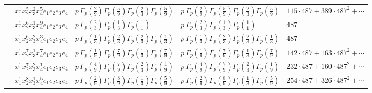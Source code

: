 \documentclass[11pt]{article}
\begin{document}
\begin{table}[ht]
{\begin{tabular}{@{}lllll@{}}
 & $x_{1}^{1} x_{2}^{5} x_{3}^{2} x_{4}^{5}  e_{1} e_{2} e_{3} e_{4}$ & $p \, \Gamma_p \left( \frac{2}{9} \right) \Gamma_p \left( \frac{5}{9} \right) \Gamma_p \left( \frac{2}{3} \right) \Gamma_p \left( \frac{5}{9} \right)$ & $p \, \Gamma_p \left( \frac{2}{9} \right) \Gamma_p \left( \frac{5}{9} \right) \Gamma_p \left( \frac{2}{3} \right) \Gamma_p \left( \frac{5}{9} \right)$ & $115{\cdot}487{+}389{\cdot}487^{2}{+}\cdots$ \\
 & $x_{1}^{1} x_{2}^{6} x_{3}^{1} x_{4}^{9}  e_{1} e_{2} e_{3} e_{4}$ & $p \, \Gamma_p \left( \frac{2}{3} \right) \Gamma_p \left( \frac{1}{3} \right) \Gamma_p \left( \frac{1}{1} \right)$ & $p \, \Gamma_p \left( \frac{2}{3} \right) \Gamma_p \left( \frac{1}{3} \right) \Gamma_p \left( \frac{1}{1} \right)$ & $487$ \\
 & $x_{1}^{1} x_{2}^{6} x_{3}^{2} x_{4}^{3}  e_{1} e_{2} e_{3} e_{4}$ & $p \, \Gamma_p \left( \frac{1}{3} \right) \Gamma_p \left( \frac{2}{3} \right) \Gamma_p \left( \frac{2}{3} \right) \Gamma_p \left( \frac{1}{3} \right)$ & $p \, \Gamma_p \left( \frac{1}{3} \right) \Gamma_p \left( \frac{2}{3} \right) \Gamma_p \left( \frac{2}{3} \right) \Gamma_p \left( \frac{1}{3} \right)$ & $487$ \\
 & $x_{1}^{1} x_{2}^{7} x_{3}^{1} x_{4}^{7}  e_{1} e_{2} e_{3} e_{4}$ & $p \, \Gamma_p \left( \frac{1}{9} \right) \Gamma_p \left( \frac{7}{9} \right) \Gamma_p \left( \frac{1}{3} \right) \Gamma_p \left( \frac{7}{9} \right)$ & $p \, \Gamma_p \left( \frac{1}{9} \right) \Gamma_p \left( \frac{7}{9} \right) \Gamma_p \left( \frac{1}{3} \right) \Gamma_p \left( \frac{7}{9} \right)$ & $142{\cdot}487{+}163{\cdot}487^{2}{+}\cdots$ \\
 & $x_{1}^{1} x_{2}^{7} x_{3}^{2} x_{4}^{1}  e_{1} e_{2} e_{3} e_{4}$ & $p \, \Gamma_p \left( \frac{4}{9} \right) \Gamma_p \left( \frac{7}{9} \right) \Gamma_p \left( \frac{2}{3} \right) \Gamma_p \left( \frac{1}{9} \right)$ & $p \, \Gamma_p \left( \frac{4}{9} \right) \Gamma_p \left( \frac{7}{9} \right) \Gamma_p \left( \frac{2}{3} \right) \Gamma_p \left( \frac{1}{9} \right)$ & $232{\cdot}487{+}160{\cdot}487^{2}{+}\cdots$ \\
 & $x_{1}^{1} x_{2}^{8} x_{3}^{1} x_{4}^{5}  e_{1} e_{2} e_{3} e_{4}$ & $p \, \Gamma_p \left( \frac{2}{9} \right) \Gamma_p \left( \frac{8}{9} \right) \Gamma_p \left( \frac{1}{3} \right) \Gamma_p \left( \frac{5}{9} \right)$ & $p \, \Gamma_p \left( \frac{2}{9} \right) \Gamma_p \left( \frac{8}{9} \right) \Gamma_p \left( \frac{1}{3} \right) \Gamma_p \left( \frac{5}{9} \right)$ & $254{\cdot}487{+}326{\cdot}487^{2}{+}\cdots$ \\

\end{tabular}}
\end{table}
\end{document}
